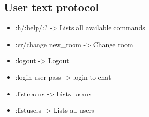\subsection{User text protocol}
\begin{itemize}
\item :h/:help/:? -> Lists all available commands
\item :cr/change new_room -> Change room
\item :logout -> Logout
\item :login user pass -> login to chat
\item :listrooms -> Lists rooms
\item :listusers -> Lists all users
\end{itemize}